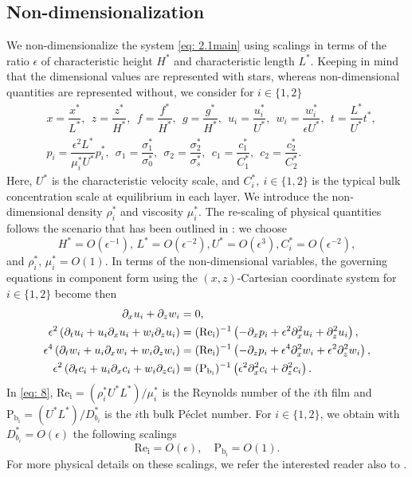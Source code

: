 \documentclass[11pt]{article}
\numberwithin{equation}{section}
\newtheorem{counter example}[theorem]{Counter Example}
\begin{document}
{\subsection{Non-dimensionalization}
We non-dimensionalize the system \eqref{eq: 2.1main} using scalings in terms of the ratio  $\epsilon$ of characteristic height $H^*$ and characteristic length $L^*$. Keeping in mind that the dimensional values are represented with stars, whereas non-dimensional quantities are represented without,  we consider  for $i\in\{1, 2\}$
\begin{align*}
&x=\dfrac{x^*}{L^*},~~z=\dfrac{z^*}{H^*},~~f=\dfrac{f^*}{H^*},~~g=\dfrac{g^*}{H^*},~~u_i=\dfrac{u_i^*}{U^*},~~w_i=\dfrac{w_i^*}{\epsilon U^*},~~t=\dfrac{L^*}{U^*}t^*,\\
&p_i=\dfrac{\epsilon^2 L^*}{\mu_i^* U^*}p_i^*,  ~~\sigma_1=\dfrac{\sigma_1^*}{\sigma_{0}^*},~~\sigma_2=\dfrac{\sigma_2^*}{\sigma_{s}^*},~~c_1=\dfrac{c_1^*}{C_1^*},~~c_2=\dfrac{c_2^*}{C_2^*}.
\end{align*}
Here, $U^*$ is the characteristic velocity scale, and $C_i^*, ~i\in \{1, 2\}$ is the typical bulk concentration scale at equilibrium in each layer. We introduce the non-dimensional density $\rho_i^*$ and viscosity $\mu^*_i$.
The re-scaling of physical quantities follows the scenario that has been outlined in \cite{barthwal2023construction, conn2017stability}: we choose 
\[
H^*= O(\epsilon^{-1}), \, L^* = O(\epsilon^{-2}),  U^*=O(\epsilon^3), C^*_i = O(\epsilon^{-2}), 
\] and 
$\rho_i^*,\, \mu^*_i = O(1)$. 
In terms of the non-dimensional variables, the governing equations in component form using the $(x, z)$-Cartesian coordinate system for $i \in \{1, 2\}$ become then
\begin{align}\label{eq: 8}
   ~~~~~~~~~\partial_x u_i+\partial_z w_i&=0,\nonumber\\
    \epsilon^2\left(\partial_t u_i+u_i\partial_x u_i+w_i\partial_z u_i\right)&=(\mathrm{Re_i})^{-1}\left(-\partial_x p_i+\epsilon^2 \partial_x^2 u_i+\partial_z^2 u_i\right),\vspace{0.2 cm} \nonumber\\
    \epsilon^4\left(\partial_t w_i+u_i\partial_x w_i+w_i\partial_z w_i\right)&=(\mathrm{Re_i})^{-1}\left(-\partial_z p_i+\epsilon^4 \partial_x^2 w_i+\epsilon^2\partial_z^2 w_i\right),\vspace{0.2 cm}\\
    \epsilon^2\left(\partial_t c_i+u_i\partial_x c_i+w_i\partial_z c_i\right)&=(\mathrm{P_{b_i}})^{-1}\left(\epsilon^2\partial_x^2 c_i+\partial_z^2 c_i\right).
\end{align}
In \eqref{eq: 8}, $\mathrm{Re_i}=(\rho_i^* U^* L^*)/\mu_i^*$ is the Reynolds number of the $i$th film and $\mathrm{P_{b_i}}=(U^*L^*)/D_{b_i}^*$ is the $i$th bulk P\'{e}clet number. For  $i\in \{1, 2\}$, we obtain with $D^*_{b_i} = O(\epsilon)$  the following scalings 
\[\mathrm{Re_i}=O(\epsilon), \quad\mathrm{P_{b_i}}=O(1).\]
For more physical details on these scalings, we refer the interested reader also to \cite{conn2017stability}.


}
\end{document}
